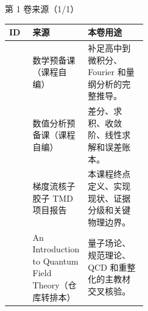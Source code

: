 \begin{frame}[t]{第 1 卷来源（1/1）}
\scriptsize\begin{tabularx}{\linewidth}{p{0.17\linewidth}p{0.28\linewidth}Y}
\toprule ID & 来源 & 本卷用途\\\midrule
{} & 数学预备课（课程自编） & 补足高中到微积分、Fourier 和量纲分析的完整推导。\\
 & 数值分析预备课（课程自编） & 差分、求积、收敛阶、线性求解和误差账本。\\
 & 梯度流核子胶子 TMD 项目报告 & 本课程终点定义、实现现状、证据分级和关键物理边界。\\
 & An Introduction to Quantum Field Theory（仓库转排本） & 量子场论、规范理论、QCD 和重整化的主教材交叉核验。\\
\bottomrule\end{tabularx}\end{frame}


